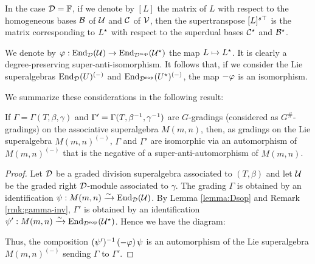 \documentclass{amsbook}
\begin{document}
\begin{remark}
	In the case $\mathcal{D}=\mathbb{F}$, if we denote by $[L]$ the matrix of $L$ with respect to the homogeneous bases $\mathcal B$ of $\mathcal U$ and $\mathcal C$ of $\mathcal V$, then the supertranspose $[L]^{s\top}$ is the matrix corresponding to $L^\star$ with respect to the superdual bases $\mathcal C^\star$ and $\mathcal B^\star$.
\end{remark}

We denote by $\varphi: \operatorname{End}_{\mathcal{D}} (\mathcal U) \rightarrow \operatorname{End}_{\mathcal{D}^{\mathrm{sop}}} (\mathcal U^\star)$ the map $L \mapsto L^\star$. It is clearly a degree-preserving super-anti-isomorphism. It follows that, if we consider the Lie superalgebras $\operatorname{End}_{\mathcal{D}} (U)^{(-)}$ and $\operatorname{End}_{\mathcal{D}^{\mathrm{sop}}} (U^\star)^{(-)}$, the map $-\varphi$ is an isomorphism.

We summarize these considerations in the following result:

\begin{lemma}\label{lemma:iso-inv}
	If $\Gamma = \Gamma(T,\beta,\gamma)$ and $\Gamma' = \Gamma(T,\beta^{-1},\gamma^{-1})$ are $G$-gradings (considered as $G^\#$-gradings) on the associative superalgebra $M(m,n)$, then, as gradings on the Lie superalgebra $M(m,n)^{(-)}$, $\Gamma$ and $\Gamma'$ are isomorphic via an automorphism of $M(m,n)^{(-)}$ that is the negative of a super-anti-automorphism of 	$M(m,n)$.
\end{lemma}

\begin{proof}
	Let $\mathcal{D}$ be a graded division superalgebra associated to $(T,\beta)$ and let $\mathcal U$ be the graded right $\mathcal{D}$-module associated to $\gamma$. The grading $\Gamma$ is obtained by an identification $\psi: M(m, n) \xrightarrow{\sim} \operatorname{End}_{\mathcal{D}} (\mathcal U)$. By Lemma \ref{lemma:Dsop} and Remark \ref{rmk:gamma-inv}, $\Gamma'$ is obtained by an identification $\psi': M(m, n) \xrightarrow{\sim} \operatorname{End}_{\mathcal{D}^{\mathrm{sop}}} (\mathcal U^\star)$. Hence we have the diagram:

	\begin{center}
	\end{center}

	Thus, the composition $(\psi')^{-1} \, (-\varphi) \, \psi$ is an automorphism of the Lie superalgebra $M(m,n)^{(-)}$ sending $\Gamma$ to $\Gamma'$.
\end{proof}
\end{document}
